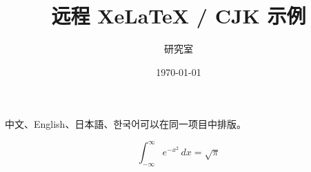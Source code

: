\documentclass[UTF8,fontset=none]{ctexart}
\title{远程 XeLaTeX / CJK 示例}
\author{研究室}
\date{\today}
\begin{document}
\maketitle

中文、English、{\japanesefont 日本語}、{\koreanfont 한국어}可以在同一项目中排版。

\[
  \int_{-\infty}^{\infty} e^{-x^2}\,dx=\sqrt{\pi}
\]
\end{document}
